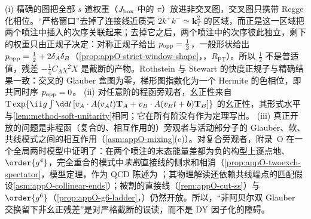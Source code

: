 \begin{remark}[共同时序是物理结果]\label{rem:dy-common-ordering}
(i) 精确的图把全部 $s$ 道权重（$J_{\rm box}$ 中的 $\pi$）放进非交叉图，交叉图只携带 Regge 化相位。“严格窗口”去掉了连接线近质壳 $2k^+k^-\simeq\mathbf k_T^2$ 的区域，而正是这一区域把两个喷注中插入的次序关联起来；去掉它之后，两个喷注中的次序彼此独立，剩下的权重只由正规子决定：对称正规子给出 $p_{\rm opp}=\frac12$，一般形状给出 $p_{\rm opp}=\frac12+2\delta_A\delta_B$（\cref{prop:appO-strict-window-shape}，\tagR，$R_{\mathrm{PT}}$）。所以 $\frac12$ 不是普适值，残差 $-\frac14C_A\chi^2X$ 是截断的产物。Rothstein 与 Stewart 的快度正规子与精确结果一致：交叉的 Glauber 盒图为零，梯形图指数化为一个 Hermite 的色相位\cite[式~(5.30)、(9.1)、(9.18)、(9.19)]{RothsteinStewart2016}，即共同时序 $p_{\rm opp}=0$。
(ii) 对任意阶的程函旁观者，幺正性来自 ${\rm T}\exp\{\ii g\int\dd t\,[v_A\cdot A(v_At)\mathbf T_A+v_B\cdot A(v_Bt+\boldsymbol b)\mathbf T_B]\}$ 的幺正性，其形式水平与\cref{lem:method-soft-unitarity}相同；它在所有阶没有作为定理写出。
(iii) 真正开放的问题是非程函（复合的、相互作用的）旁观者与活动部分子的 Glauber、软、共线模式之间的相互作用（\cref{asm:appO-mixing}(c)）。对复合旁观者，附录~O 在一个全局两时模型中证明了：在两个喷注的末态能量差都为负的构型上逐点地、$\order{g^4}$，完全重合的模式中\emph{未割}直接线的侧求和相消（\cref{prop:appO-twoexch-spectator}，模型定理，作为 QCD 陈述为 \tagP；其物理解读还依赖共线端点的匹配假设\cref{asm:appO-collinear-ends}）；被割的直接线（\cref{rem:appO-cut-ss}）与 $\order{g^6}$（\cref{prop:appO-g6-ladder}，\tagA）仍然开放。所以，“非阿贝尔双 Glauber 交换留下非幺正残差”是对严格截断的误读，而不是 DY 因子化的障碍。
\end{remark}

